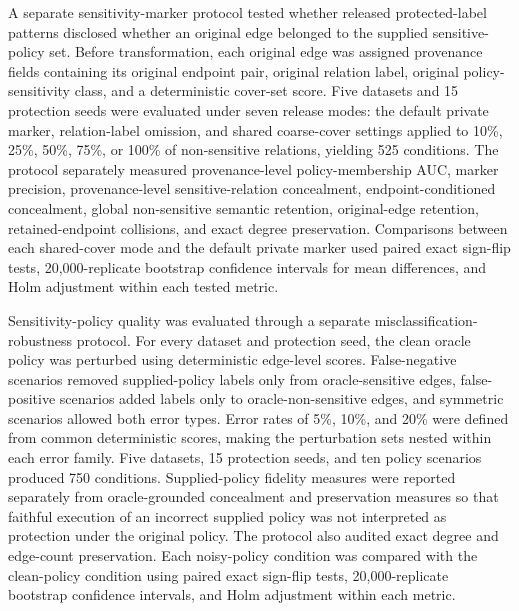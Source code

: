 \documentclass[preprint,12pt]{elsarticle}
\begin{document}
A separate sensitivity-marker protocol tested whether released protected-label patterns disclosed whether an original edge belonged to the supplied sensitive-policy set. Before transformation, each original edge was assigned provenance fields containing its original endpoint pair, original relation label, original policy-sensitivity class, and a deterministic cover-set score. Five datasets and 15 protection seeds were evaluated under seven release modes: the default private marker, relation-label omission, and shared coarse-cover settings applied to 10\%, 25\%, 50\%, 75\%, or 100\% of non-sensitive relations, yielding 525 conditions. The protocol separately measured provenance-level policy-membership AUC, marker precision, provenance-level sensitive-relation concealment, endpoint-conditioned concealment, global non-sensitive semantic retention, original-edge retention, retained-endpoint collisions, and exact degree preservation. Comparisons between each shared-cover mode and the default private marker used paired exact sign-flip tests, 20,000-replicate bootstrap confidence intervals for mean differences, and Holm adjustment within each tested metric.

Sensitivity-policy quality was evaluated through a separate misclassification-robustness protocol. For every dataset and protection seed, the clean oracle policy was perturbed using deterministic edge-level scores. False-negative scenarios removed supplied-policy labels only from oracle-sensitive edges, false-positive scenarios added labels only to oracle-non-sensitive edges, and symmetric scenarios allowed both error types. Error rates of 5\%, 10\%, and 20\% were defined from common deterministic scores, making the perturbation sets nested within each error family. Five datasets, 15 protection seeds, and ten policy scenarios produced 750 conditions. Supplied-policy fidelity measures were reported separately from oracle-grounded concealment and preservation measures so that faithful execution of an incorrect supplied policy was not interpreted as protection under the original policy. The protocol also audited exact degree and edge-count preservation. Each noisy-policy condition was compared with the clean-policy condition using paired exact sign-flip tests, 20,000-replicate bootstrap confidence intervals, and Holm adjustment within each metric.
\end{document}
